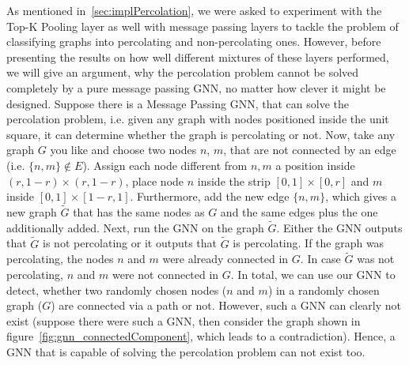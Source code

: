 As mentioned in~\ref{sec:implPercolation}, we were asked to experiment with the Top-K Pooling layer as well with message passing layers 
to tackle the problem of classifying graphs into percolating and non-percolating ones. 
However, before presenting the results on how well different mixtures of these layers performed, we will give an argument, why the percolation problem 
cannot be solved completely by a pure message passing GNN, no matter how clever it might be designed.
Suppose there is a Message Passing GNN, that can solve the percolation problem, i.e. given any graph 
with nodes positioned inside the unit square, it can determine whether the graph is percolating or not. 
Now, take any graph $G$ you like and choose two nodes $n$, $m$, that are not connected by an edge (i.e. $\{n,m\}\notin E$). 
Assign each node different from $n, m$ a position inside 
$(r, 1-r)\times(r, 1-r)$, place node $n$ inside the strip $[0,1]\times [0,r]$ and $m$ inside $[0,1]\times[1-r, 1]$. 
Furthermore, add the new edge $\{n,m\}$, which gives a new graph $\tilde{G}$ that has the same nodes
as $G$ and the same edges plus the one additionally added. Next, run the GNN on the graph $\tilde{G}$. 
Either the GNN outputs that $\tilde{G}$ is not percolating or it outputs that $\tilde{G}$ is percolating. 
If the graph was percolating, the nodes $n$ and $m$ were already connected in $G$. 
In case $\tilde{G}$ was not percolating, $n$ and $m$ were not connected in $G$. 
In total, we can use our GNN to detect, whether two randomly chosen nodes ($n$ and $m$) in a randomly 
chosen graph ($G$) are connected via a path or not.
However, such a GNN can clearly not exist (suppose there were such a GNN, 
then consider the graph shown in figure~\ref{fig:gnn_connectedComponent}, which leads to
a contradiction).
Hence, a GNN that is capable of solving the percolation problem can not exist too.
